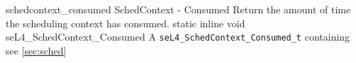 %
%
%
%

\apidoc
{schedcontext_consumed}
{SchedContext - Consumed}
{
Return the amount of time the scheduling context has consumed.
}
{static inline void seL4\_SchedContext\_Consumed}
{
}
{A \texttt{seL4\_SchedContext\_Consumed\_t} containing \consumeddesc}
{see \autoref{sec:sched}}
